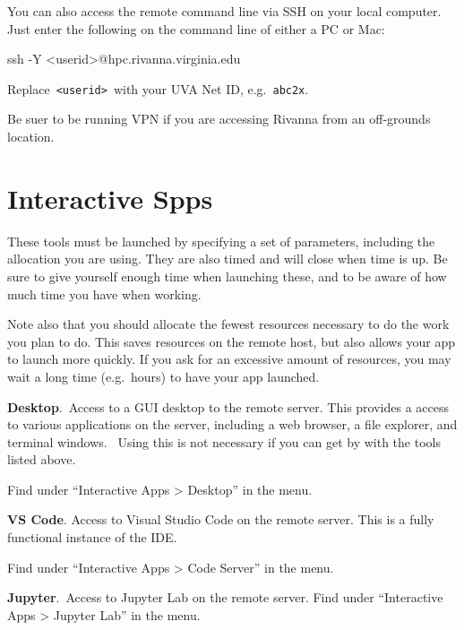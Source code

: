 \documentclass[
  letterpaper,
  DIV=11,
  numbers=noendperiod]{scrreport}
\newenvironment{Shaded}{\begin{snugshade}}{\end{snugshade}}
\newcommand{\AttributeTok}[1]{\textcolor[rgb]{0.40,0.45,0.13}{#1}}
\newcommand{\FunctionTok}[1]{\textcolor[rgb]{0.28,0.35,0.67}{#1}}
\newcommand{\NormalTok}[1]{\textcolor[rgb]{0.00,0.23,0.31}{#1}}
\newcommand{\OperatorTok}[1]{\textcolor[rgb]{0.37,0.37,0.37}{#1}}
\begin{document}
You can also access the remote command line via SSH on your local
computer. Just enter the following on the command line of either a PC or
Mac:

\begin{Shaded}
\begin{Highlighting}[]
\FunctionTok{ssh} \AttributeTok{{-}Y} \OperatorTok{\textless{}}\NormalTok{userid}\OperatorTok{\textgreater{}}\NormalTok{@hpc.rivanna.virginia.edu}
\end{Highlighting}
\end{Shaded}

Replace~\texttt{\textless{}userid\textgreater{}}~with your UVA Net ID,
e.g.~\texttt{abc2x}.~

Be suer to be running VPN if you are accessing Rivanna from an
off-grounds location.

\hypertarget{interactive-spps}{%
\section{Interactive Spps}\label{interactive-spps}}

These tools must be launched by specifying a set of parameters,
including the allocation you are using. They are also timed and will
close when time is up. Be sure to give yourself enough time when
launching these, and to be aware of how much time you have when working.

Note also that you should allocate the fewest resources necessary to do
the work you plan to do. This saves resources on the remote host, but
also allows your app to launch more quickly. If you ask for an excessive
amount of resources, you may wait a long time (e.g.~hours) to have your
app launched.

\textbf{Desktop}.~Access to a GUI desktop to the remote server. This
provides a access to various applications on the server, including a web
browser, a file explorer, and terminal windows.~ Using this is not
necessary if you can get by with the tools listed above.

Find under ``Interactive Apps \textgreater{} Desktop'' in the menu.

\textbf{VS Code}. Access to Visual Studio Code on the remote server.
This is a fully functional instance of the IDE.

Find under ``Interactive Apps \textgreater{} Code Server'' in the menu.

\textbf{Jupyter}.~Access to Jupyter Lab on the remote server. Find under
``Interactive Apps \textgreater{} Jupyter Lab'' in the menu.
\end{document}

